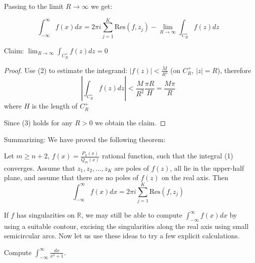 Passing to the limit $R \to \infty$ we get:


\[
\int_{-\infty}^{\infty} f(x) dx = 2\pi i \sum_{j=1}^K \text{Res}(f, z_j) - \lim_{R \to \infty} \int_{C_R^+} f(z) dz
\]
\begin{claim}
    
    Claim: $\lim_{R \to \infty} \int_{C_R^+} f(z) dz = 0$
\end{claim}
\begin{proof}
    
Use (2) to estimate the integrand:
    $|f(z)| < \frac{M}{R^2}$ (on $C_R^+$, $|z| = R$), therefore
    \[
        \left| \int_{C_R^+} f(z) dz \right| < \frac{M}{R^2} \frac{\pi R}{H} = \frac{M \pi}{R}
        \]
        where $H$ is the length of $C_R^+$
        
        Since (3) holds for any $R > 0$ we obtain the claim.
    \end{proof}

Summarizing: We have proved the following theorem:
\begin{theorem}\label{theorem:21.1}
    Let $m \ge n+2$, $f(x) = \frac{P_n(x)}{Q_m(x)}$ rational function, such that the integral (1) converges. Assume that $z_1, z_2, \dots, z_K$ are poles of $f(z)$, 
    all lie in the upper-half plane, and assume that there are no poles of $f(z)$ on the real axis. Then
    \[
        \int_{-\infty}^{\infty} f(x) dx = 2\pi i \sum_{j=1}^K \text{Res}(f, z_j)
        \]
    \end{theorem}

\begin{remark}
    If $f$ has singularities on $\mathbb{R}$, we may still be able to compute $\int_{-\infty}^{\infty} f(x) dx$ by using a suitable contour, excising the singularities along the real 
    axis using small semicircular arcs. Now let us use these ideas to try a few explicit calculations.
\end{remark}
\begin{example}\label{example:24.1}
    Compute $\int_{-\infty}^{\infty} \frac{dx}{x^2 + 1}$.
\end{example}


